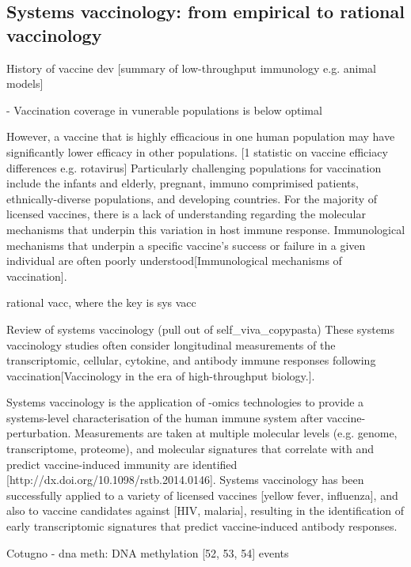 \subsection{Systems vaccinology: from empirical to rational vaccinology}

History of vaccine dev
[summary of low-throughput immunology e.g. animal models]  

- Vaccination coverage in vunerable populations is below optimal

However, a vaccine that is highly efficacious in one human population may have significantly lower efficacy in other populations.
[1 statistic on vaccine efficiacy differences e.g. rotavirus]
Particularly challenging populations for vaccination include the infants and elderly, pregnant, immuno comprimised patients, ethnically-diverse populations, and developing countries.
For the majority of licensed vaccines, there is a lack of understanding regarding the molecular mechanisms that underpin this variation in host immune response.
Immunological mechanisms that underpin a specific vaccine's success or failure in a given individual are often poorly understood[Immunological mechanisms of vaccination]. 

rational vacc, where the key is sys vacc

Review of systems vaccinology (pull out of self\_viva\_copypasta)
These systems vaccinology studies often consider longitudinal measurements of the transcriptomic, cellular, cytokine, and antibody immune responses following vaccination[Vaccinology in the era of high-throughput biology.].

Systems vaccinology is the application of -omics technologies to provide a systems-level characterisation of the human immune system after vaccine-perturbation.
Measurements are taken at multiple molecular levels (e.g. genome, transcriptome, proteome), and molecular signatures that correlate with and predict vaccine-induced immunity are identified [http://dx.doi.org/10.1098/rstb.2014.0146].
Systems vaccinology has been successfully applied to a variety of licensed vaccines [yellow fever, influenza], and also to vaccine candidates against [HIV, malaria], resulting in the identification of early transcriptomic signatures that predict vaccine-induced antibody responses.


Cotugno
- dna meth: DNA methylation [52, 53, 54] events


